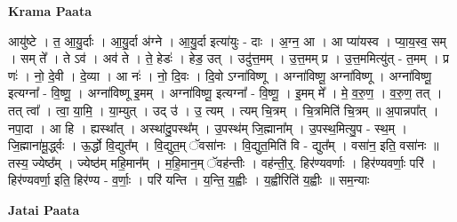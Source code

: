 \documentclass[17pt]{extarticle}
\begin{document}
\textbf{Krama Paata} \newline

आयु॑ष्टे । त॒ आ॒यु॒र्दाः । आ॒यु॒र्दा अ॑ग्ने । आ॒यु॒र्दा इत्या॑युः - दाः । अ॒ग्न॒ आ । आ प्या॑यस्व । प्या॒य॒स्व॒ सम् । सम् ते᳚ । ते ऽव॑ । अव॑ ते । ते॒ हेडः॑ । हेड॒ उत् । उदु॑त्त॒मम् । उ॒त्त॒मम् प्र । उ॒त्त॒ममित्यु॑त् - त॒मम् । प्र णः॑ । नो॒ दे॒वी । दे॒व्या । आ नः॑ । नो॒ दि॒वः । दि॒वो ऽग्ना॑विष्णू । अग्ना॑विष्णू॒ अग्ना॑विष्णू । अग्ना॑विष्णू॒ इत्यग्ना᳚ - वि॒ष्णू॒ । अग्ना॑विष्णू इ॒मम् । अग्ना॑विष्णू॒ इत्यग्ना᳚ - वि॒ष्णू॒ । इ॒मम् मे᳚ । मे॒ व॒रु॒ण॒ । व॒रु॒ण॒ तत् । तत् त्वा᳚ । त्वा॒ या॒मि॒ । या॒म्युत् । उद् उ॑ । उ॒ त्यम् । त्यम् चि॒त्रम् । चि॒त्रमिति॑ चि॒त्रम् ॥ अ॒पान्नपा᳚त् । नपा॒दा । आ हि । ह्यस्था᳚त् । अस्था॑दु॒पस्थ᳚म् । उ॒पस्थ॑म् जि॒ह्माना᳚म् । उ॒पस्थ॒मित्यु॒प - स्थ॒म् । जि॒ह्माना॑मू॒र्द्ध्वः । ऊ॒र्द्धो वि॒द्युत᳚म् । वि॒द्युत॒म् ॅवसा॑नः । वि॒द्युत॒मिति॑ वि - द्युत᳚म् । वसा॑न॒ इति॒ वसा॑नः ॥ तस्य॒ ज्येष्ठ᳚म् । ज्येष्ठ॑म् महि॒मान᳚म् । म॒हि॒मान॒म् ॅवह॑न्तीः । वह॑न्ती॒र्॒. हिर॑ण्यवर्णाः । हिर॑ण्यवर्णाः॒ परि॑ । हिर॑ण्यवर्णा॒ इति॒ हिर॑ण्य - व॒र्णाः॒ । परि॑ यन्ति । य॒न्ति॒ य॒ह्वीः । य॒ह्वीरिति॑ य॒ह्वीः ॥ सम॒न्याः \newline

\textbf{Jatai Paata} \newline
\end{document}
